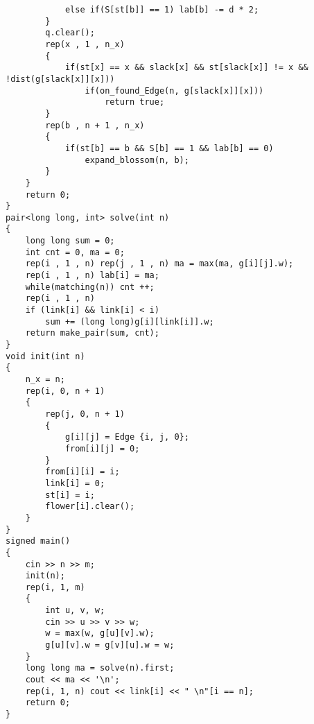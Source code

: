 \documentclass[E:/GsjzTle/main/main.tex]{subfiles}
\begin{document}
\begin{lstlisting}
			else if(S[st[b]] == 1) lab[b] -= d * 2;
		}
		q.clear();
		rep(x , 1 , n_x)
		{
			if(st[x] == x && slack[x] && st[slack[x]] != x && !dist(g[slack[x]][x]))
				if(on_found_Edge(n, g[slack[x]][x]))
					return true;
		}
		rep(b , n + 1 , n_x)
		{
			if(st[b] == b && S[b] == 1 && lab[b] == 0)
				expand_blossom(n, b);
		}
	}
	return 0;
}
pair<long long, int> solve(int n)
{
	long long sum = 0;
	int cnt = 0, ma = 0;
	rep(i , 1 , n) rep(j , 1 , n) ma = max(ma, g[i][j].w);
	rep(i , 1 , n) lab[i] = ma;
	while(matching(n)) cnt ++;
	rep(i , 1 , n)
	if (link[i] && link[i] < i)
		sum += (long long)g[i][link[i]].w;
	return make_pair(sum, cnt);
}
void init(int n)
{
	n_x = n;
	rep(i, 0, n + 1)
	{
		rep(j, 0, n + 1)
		{
			g[i][j] = Edge {i, j, 0};
			from[i][j] = 0;
		}
		from[i][i] = i;
		link[i] = 0;
		st[i] = i;
		flower[i].clear();
	}
}
signed main()
{
	cin >> n >> m;
	init(n);
	rep(i, 1, m)
	{
		int u, v, w;
		cin >> u >> v >> w;
		w = max(w, g[u][v].w);
		g[u][v].w = g[v][u].w = w;
	}
	long long ma = solve(n).first;
	cout << ma << '\n';
	rep(i, 1, n) cout << link[i] << " \n"[i == n];
	return 0;
}
\end{lstlisting}
\end{document}
